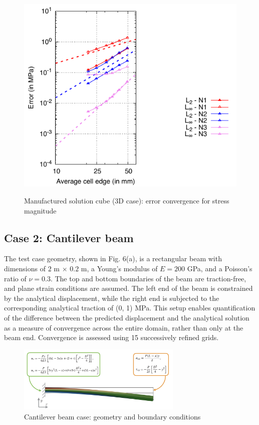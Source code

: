 \documentclass[sn-mathphys,Numbered]{sn-jnl}%
\begin{document}
\begin{figure}[H]
{    		\includegraphics[scale=0.8]{figures/mms/3D/mms_stressErrors_ho-poly}  
    }
 	\caption{Manufactured solution cube (3D case): error convergence for stress magnitude}
 	\label{fig:jj}
 \end{figure}
%
\subsection{Case 2: Cantilever beam}
%
The test case geometry, shown in Fig. 6(a), is a rectangular beam with dimensions of $2$ m $\times$ $0.2$ m, a Young’s modulus of $E = 200$ GPa, and a Poisson’s ratio of $\nu = 0.3$. The top and bottom boundaries of the beam are traction-free, and plane strain conditions are assumed. The left end of the beam is constrained by the analytical displacement, while the right end is subjected to the corresponding analytical traction of (0, 1) MPa. This setup enables quantification of the difference between the predicted displacement and the analytical solution as a measure of convergence across the entire domain, rather than only at the beam end. Convergence is assessed using 15 successively refined grids.
%
\begin{figure}[H]
	\centering
	\includegraphics[width=0.7\textwidth]{figures/cantilever/cantilever.png} 
	\caption{Cantilever beam case: geometry and boundary conditions}
	\label{fig:cantilever}
\end{figure}
\end{document}
